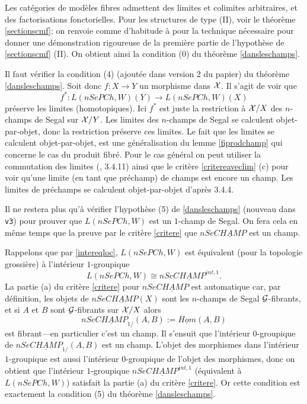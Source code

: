 \documentclass[12pt]{article}
\newcommand{\Gg}{{\cal G}}
\newcommand{\Xx}{{\cal X}}
\begin{document}
Les
cat\'egories de mod\`eles fibres admettent des limites et colimites
arbitraires, et des
factorisations fonctorielles. Pour les structures de type (II), voir le
th\'eor\`eme
\ref{sectionscmf}; on renvoie comme d'habitude \`a \cite{Jardine} pour la
technique n\'ecessaire pour
donner une d\'emonstration rigoureuse de la premi\`ere partie de
l'hypoth\`ese de \ref{sectionscmf}
(II). On obtient ainsi la condition (0) du th\'eor\`eme \ref{dansleschamps}.


Il faut v\'erifier la condition (4)
(ajout\'ee dans version 2 du papier) du th\'eor\`eme \ref{dansleschamps}. 
Soit donc $f:X\rightarrow
Y$ un morphisme dans $\Xx$. Il s'agit de voir que
$$
f^{\ast} :L(nSePCh , W)(Y) \rightarrow L(nSePCh , W) (X)
$$
pr\'eserve les limites (homotopiques). Ici $f^{\ast}$ est juste la restriction
\`a $\Xx /X$ des $n$-champs de Segal sur $\Xx /Y$. Les limites des
$n$-champs de Segal se calculent objet-par-objet, donc la restriction pr\'eserve
ces limites. Le fait que les limites se calculent objet-par-objet,
est une g\'en\'eralisation du lemme \ref{fiprodchamp} qui concerne le cas du produit
fibr\'e. Pour le cas g\'en\'eral on peut utiliser la commutation des limites
(\cite{Vogt2}, \cite{limits} 3.4.11) ainsi que le crit\`ere \ref{critereaveclim} (c) pour voir qu'une 
limite (en tant que pr\'echamp)
de champs est encore un champ. Les limites de pr\'echamps se calculent
objet-par-objet d'apr\`es \cite{limits} 3.4.4. 



Il ne restera plus qu'\`a v\'erifier l'hypoth\`ese (5) de
\ref{dansleschamps} (nouveau dans {\tt v3})
pour prouver que $L(nSePCh, W)$
est un $1$-champ de Segal. On fera cela en m\^eme temps que la preuve par
le crit\`ere \ref{critere} que $nSe\underline{CHAMP}$ est un champ.

Rappelons que par \ref{intereqloc}, $L(nSePCh, W)$
est \'equivalent (pour la topologie
grossi\`ere) \`a l'int\'erieur $1$-groupique
$$
L(nSePCh, W) \cong nSe\underline{CHAMP}^{int,1}.
$$
La partie (a) du crit\`ere \ref{critere} pour $nSe\underline{CHAMP}$
est automatique  car, par d\'efinition, les
objets de $nSe\underline{CHAMP}(X)$ sont les $n$-champs de Segal $\Gg$-fibrants,
et si $A$ et $B$ sont $\Gg$-fibrants sur $\Xx /X$
alors 
$$
nSe\underline{CHAMP}_{1/}(A,B) := 
\underline{Hom}(A,B)
$$ 
est fibrant---en particulier c'est un champ.
Il s'ensuit que l'int\'erieur $0$-groupique de 
$nSe\underline{CHAMP}_{1/}(A,B)$ est un champ. L'objet des morphismes dans
l'int\'erieur $1$-groupique est aussi l'int\'erieur $0$-groupique de
l'objet des morphismes, donc on obtient que
l'int\'erieur $1$-groupique
$nSe\underline{CHAMP}^{int,1}$
(\'equivalent \`a $L(nSePCh, W)$)
satisfait la partie (a) du crit\`ere \ref{critere}. Or cette condition
est exactement la condition (5) du th\'eor\`eme \ref{dansleschamps}.
\end{document}
